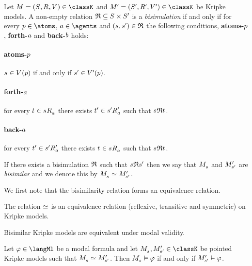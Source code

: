 \begin{definition}[Bisimulation]
Let $\modelAndTuple \in \classK$ and $\modelAndTuple[\prime] \in \classK$ be Kripke models.
A non-empty relation $\bisimulation \subseteq \states \times \states[\prime]$ is a {\em bisimulation} if and only if for every $\atomP \in \atoms$, $\agentA \in \agents$ and $(\stateS, \stateS[\prime]) \in \bisimulation$ the following conditions, {\bf atoms-$\atomP$}, {\bf forth-$\agentA$} and {\bf back-$\agentB$} holds:

\paragraph{atoms-$\atomP$}
$\stateS \in \valuation(\atomP)$ if and only if $\stateS[\prime] \in \valuation[\prime](\atomP)$.

\paragraph{forth-$\agentA$}
for every $\stateT \in \successors{\agentA}{\stateS}$ there exists $\stateT[\prime] \in \successors[\prime]{\agentA}{\stateS[\prime]}$ such that $\stateS \bisimulation \stateT$.

\paragraph{back-$\agentA$}
for every $\stateT[\prime] \in \successors[\prime]{\agentA}{\stateS[\prime]}$ there exists $\stateT \in \successors{\agentA}{\stateS}$ such that $\stateS \bisimulation \stateT$.

If there exists a bisimulation $\bisimulation$ such that $\stateS \bisimulation \stateS[\prime]$ then we say that $\pointedModel{\stateS}$ and $\pointedModel[\prime]{\stateS[\prime]}$ are {\em bisimilar} and we denote this by $\pointedModel{\stateS} \bisimilar \pointedModel[\prime]{\stateS[\prime]}$.
\end{definition}

We first note that the bisimilarity relation forms an equivalence relation.

\begin{proposition}
The relation $\bisimilar$ is an equivalence relation (reflexive, transitive and symmetric) on Kripke models.
\end{proposition}

Bisimilar Kripke models are equivalent under modal validity.

\begin{proposition}
Let $\phi \in \langMl$ be a modal formula and 
let $\pointedModel{\stateS}, \pointedModel[\prime]{\stateS[\prime]} \in \classK$ be pointed Kripke models such that $\pointedModel{\stateS} \bisimilar \pointedModel[\prime]{\stateS[\prime]}$.
Then $\pointedModel{\stateS} \entails \phi$ if and only if $\pointedModel[\prime]{\stateS[\prime]} \entails \phi$.
\end{proposition}

